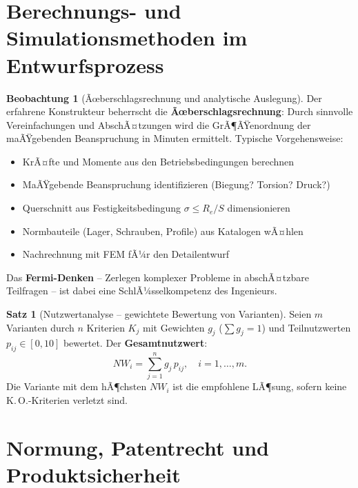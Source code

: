 ﻿\documentclass[a4paper,12pt]{report}
\theoremstyle{definition}
\newtheorem{satz}{Satz}
\newtheorem{beobachtung}{Beobachtung}
\begin{document}
\section{Berechnungs- und Simulationsmethoden im Entwurfsprozess}

\begin{beobachtung}[Ãœberschlagsrechnung und analytische Auslegung]
Der erfahrene Konstrukteur beherrscht die \textbf{Ãœberschlagsrechnung}:
Durch sinnvolle Vereinfachungen und AbschÃ¤tzungen wird die GrÃ¶ÃŸenordnung
der maÃŸgebenden Beanspruchung in Minuten ermittelt.
Typische Vorgehensweise:
\begin{itemize}
    \item[-] KrÃ¤fte und Momente aus den Betriebsbedingungen berechnen
    \item[-] MaÃŸgebende Beanspruchung identifizieren (Biegung? Torsion? Druck?)
    \item[-] Querschnitt aus Festigkeitsbedingung $\sigma \le R_e/S$ dimensionieren
    \item[-] Normbauteile (Lager, Schrauben, Profile) aus Katalogen wÃ¤hlen
    \item[-] Nachrechnung mit FEM fÃ¼r den Detailentwurf
\end{itemize}
Das \textbf{Fermi-Denken} -- Zerlegen komplexer Probleme in abschÃ¤tzbare
Teilfragen -- ist dabei eine SchlÃ¼sselkompetenz des Ingenieurs.
\end{beobachtung}

\begin{satz}[Nutzwertanalyse -- gewichtete Bewertung von Varianten]
Seien $m$ Varianten durch $n$ Kriterien $K_j$ mit Gewichten $g_j$ ($\sum g_j = 1$)
und Teilnutzwerten $p_{ij} \in [0, 10]$ bewertet. Der \textbf{Gesamtnutzwert}:
\[
  NW_i = \sum_{j=1}^n g_j\,p_{ij}, \quad i = 1, \ldots, m.
\]
Die Variante mit dem hÃ¶chsten $NW_i$ ist die empfohlene LÃ¶sung,
sofern keine K.\,O.-Kriterien verletzt sind.
\end{satz}

\section{Normung, Patentrecht und Produktsicherheit}
\end{document}
